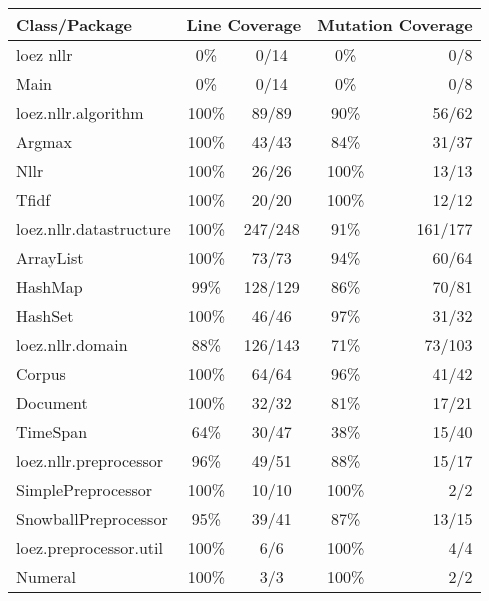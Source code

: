 \documentclass[12pt,a4paper]{article}
\begin{document}
\begin{tabular}{l |c |c |c |r}
\textbf{Class/Package}		&	\multicolumn{2}{|c}{\textbf{Line Coverage}} & \multicolumn{2}{|c}{\textbf{Mutation Coverage}} \\
\hline
loez nllr				&	0\%	 	& 0/14		& 0\%	& 0/8 	\\
\hspace{10 mm}Main 		&	0\%	 	& 0/14		& 0\%	& 0/8 	\\
\hline
loez.nllr.algorithm	&	100\% 	& 89/89 		& 90\%	& 56/62 	\\
\hspace{10 mm}Argmax			&	100\%	& 43/43		& 84\%	& 31/37 \\
\hspace{10 mm}Nllr			&	100\%	& 26/26		& 100\% 	& 13/13 \\
\hspace{10 mm}Tfidf			&	100\%	& 20/20		& 100\%	& 12/12 \\ 
\hline
loez.nllr.datastructure&	100\%	& 247/248	& 91\%	& 161/177 \\
\hspace{10 mm}ArrayList		&	100\%	&	73/73	& 94\%	&	60/64 \\
\hspace{10 mm}HashMap		&	99\%		&	128/129	& 86\%	&	70/81 \\
\hspace{10 mm}HashSet		&	100\%	&	46/46	& 97\%	&	31/32 \\
\hline
loez.nllr.domain & 88\%	&	126/143 	& 	71\%		&	73/103 \\
\hspace{10 mm}Corpus	&	100\%	&	64/64	&	96\%		&	41/42 \\
\hspace{10 mm}Document	&	100\%	&	32/32	&	81\%		&	17/21 \\
\hspace{10 mm}TimeSpan	&	64\%		&	30/47	&	38\%		&	15/40 \\
\hline
loez.nllr.preprocessor & 96\% & 49/51 & 88\% & 15/17 \\
\hspace{10 mm}SimplePreprocessor & 100\% & 10/10 & 100\% & 2/2 \\
\hspace{10 mm}SnowballPreprocessor & 95\% & 39/41 & 87\% & 13/15 \\ 
\hline
loez.preprocessor.util & 100\% & 6/6 & 100\% & 4/4 \\
\hspace{10 mm}Numeral & 100\% & 3/3 & 100\% & 2/2 \\

\end{tabular}
\end{document}
